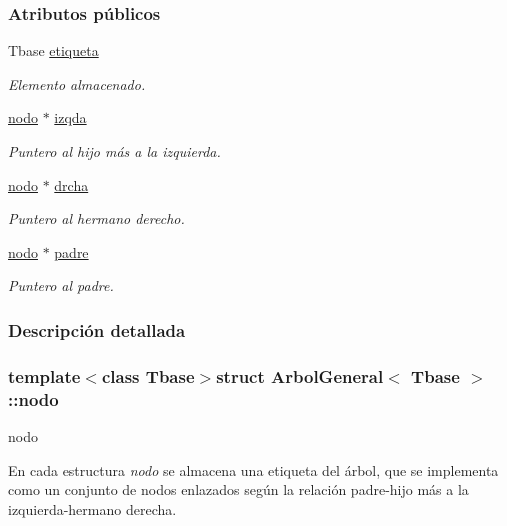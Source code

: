 \subsubsection*{Atributos públicos}
\begin{DoxyCompactItemize}
\item 
Tbase \hyperlink{structArbolGeneral_1_1nodo_ab7223965c5a62aa93895f3decd7a109a}{etiqueta}
\begin{DoxyCompactList}\small\item\em Elemento almacenado. \end{DoxyCompactList}\item 
\hyperlink{structArbolGeneral_1_1nodo}{nodo} $\ast$ \hyperlink{structArbolGeneral_1_1nodo_a3b8075b9fd0dc27c2272ba48bd9a9221}{izqda}
\begin{DoxyCompactList}\small\item\em Puntero al hijo más a la izquierda. \end{DoxyCompactList}\item 
\hyperlink{structArbolGeneral_1_1nodo}{nodo} $\ast$ \hyperlink{structArbolGeneral_1_1nodo_a8d0a58447171461212942f9308ef4f36}{drcha}
\begin{DoxyCompactList}\small\item\em Puntero al hermano derecho. \end{DoxyCompactList}\item 
\hyperlink{structArbolGeneral_1_1nodo}{nodo} $\ast$ \hyperlink{structArbolGeneral_1_1nodo_ab4d70a0179e8450b2842bbf1a6481402}{padre}
\begin{DoxyCompactList}\small\item\em Puntero al padre. \end{DoxyCompactList}\end{DoxyCompactItemize}


\subsubsection{Descripción detallada}
\subsubsection*{template$<$class Tbase$>$struct Arbol\-General$<$ Tbase $>$\-::nodo}

nodo 

En cada estructura {\itshape nodo} se almacena una etiqueta del árbol, que se implementa como un conjunto de nodos enlazados según la relación padre-\/hijo más a la izquierda-\/hermano derecha. 

